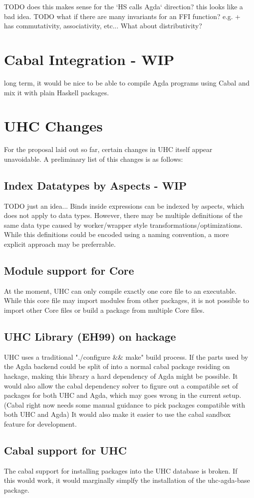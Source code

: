 \documentclass[12pt, a4paper, twoside]{report}
\begin{document}
TODO does this makes sense for the `HS calls Agda` direction? this looks like a bad idea.
TODO what if there are many invariants for an FFI function? e.g. + has
commutativity, associativity, etc... What about distributivity?
\section{Cabal Integration - WIP}
long term, it would be nice to be able to compile Agda programs using Cabal and
mix it with plain Haskell packages.

\section{UHC Changes}
For the proposal laid out so far, certain changes in UHC itself appear
unavoidable. A preliminary list of this changes is as follows:

\subsection{Index Datatypes by Aspects - WIP}
TODO just an idea...
Binds inside expressions can be indexed by aspects, which does
not apply to data types. However, there may be multiple definitions
of the same data type caused by worker/wrapper style transformations/optimizations.
While this definitions could be encoded using a naming convention, a more explicit
approach may be preferrable.

\subsection{Module support for Core}
At the moment, UHC can only compile exactly one core file to an executable.
While this core file may import modules from other packages, it is not possible
to import other Core files or build a package from multiple Core files.

\subsection{UHC Library (EH99) on hackage}
UHC uses a traditional "./configure \&\& make" build process. If the parts used by the
Agda backend could be split of into a normal cabal package residing on hackage,
making this library a hard dependency of Agda might be possible.
It would also allow the cabal dependency solver to figure out a compatible
set of packages for both UHC and Agda, which may goes wrong in the current setup.
(Cabal right now needs some manual guidance to pick packages compatible with both UHC and Agda)
It would also make it easier to use the cabal sandbox feature for development.

\subsection{Cabal support for UHC}
The cabal support for installing packages into the UHC database is broken. If this would work, it
would marginally simplfy the installation of the uhc-agda-base package.


{}

\end{document}
